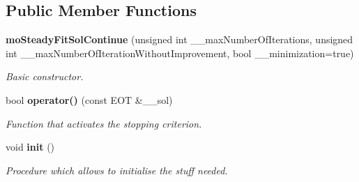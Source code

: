 \subsection*{Public Member Functions}
\begin{CompactItemize}
\item 
{\bf moSteadyFitSolContinue} (unsigned int \_\-\_\-maxNumberOfIterations, unsigned int \_\-\_\-maxNumberOfIterationWithoutImprovement, bool \_\-\_\-minimization=true)
\begin{CompactList}\small\item\em Basic constructor. \item\end{CompactList}\item 
bool {\bf operator()} (const EOT \&\_\-\_\-sol)
\begin{CompactList}\small\item\em Function that activates the stopping criterion. \item\end{CompactList}\item 
void {\bf init} ()\label{classmo_steady_fit_sol_continue_87563493addc8e4b58982c55a67179b9}

\begin{CompactList}\small\item\em Procedure which allows to initialise the stuff needed. \item\end{CompactList}\end{CompactItemize}
